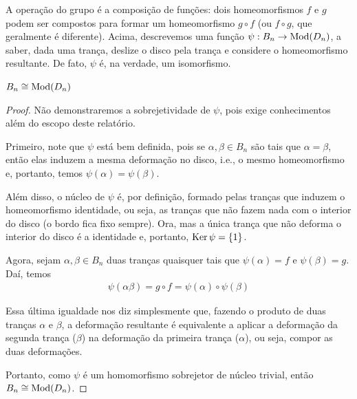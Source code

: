 	\par\vspace{0.3cm} A operação do grupo é a composição de funções: dois homeomorfismos $f$ e $g$ podem ser compostos para formar um homeomorfismo $g\circ f$ (ou $f\circ g$, que geralmente é diferente). Acima, descrevemos uma função $\psi: B_n\to\operatorname{Mod}(D_n)$, a saber, dada uma trança, deslize o disco pela trança e considere o homeomorfismo resultante. De fato, $\psi$ é, na verdade, um isomorfismo.
	
	\begin{theorem}
		\label{B_n isomorfo a Mod(D_n)}
		$B_n\cong \operatorname{Mod}(D_n)$ 
	\end{theorem}
	
	\begin{proof}
		Não demonstraremos a sobrejetividade de $\psi$, pois exige conhecimentos além do escopo deste relatório.
		\par\vspace{0.3cm} Primeiro, note que $\psi$ está bem definida, pois se $\alpha, \beta\in B_n$ são tais que $\alpha = \beta$, então elas induzem a mesma deformação no disco, i.e., o mesmo homeomorfismo e, portanto, temos $\psi(\alpha) = \psi(\beta)$.
		\par\vspace{0.3cm} Além disso, o núcleo de $\psi$ é, por definição, formado pelas tranças que induzem o homeomorfismo identidade, ou seja, as tranças que não fazem nada com o interior do disco (o bordo fica fixo sempre). Ora, mas a única trança que não deforma o interior do disco é a identidade e, portanto, $\operatorname{Ker}\psi = \{1\}$.
		\par\vspace{0.3cm} Agora, sejam $\alpha, \beta\in B_n$ duas tranças quaisquer tais que $\psi(\alpha) = f$ e $\psi(\beta) = g$. Daí, temos
		\begin{align*}
		\psi(\alpha\beta) = g\circ f = \psi(\alpha)\circ\psi(\beta)
		\end{align*}
		\par\vspace{0.3cm} Essa última igualdade nos diz simplesmente que, fazendo o produto de duas tranças $\alpha$ e $\beta$, a deformação resultante é equivalente a aplicar a deformação da segunda trança ($\beta$) na deformação da primeira trança ($\alpha$), ou seja, compor as duas deformações. 
		\par\vspace{0.3cm} Portanto, como $\psi$ é um homomorfismo sobrejetor de núcleo trivial, então $B_n\cong\operatorname{Mod}(D_n)$.
	\end{proof}
	
